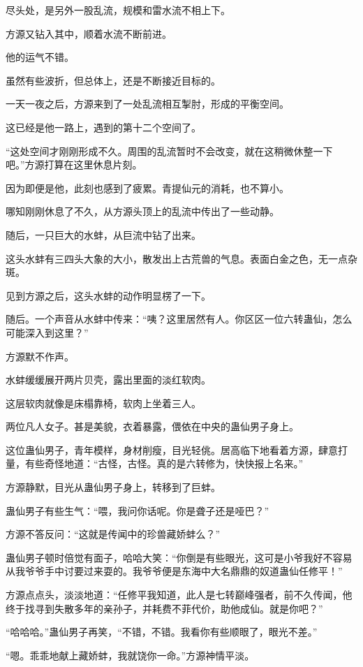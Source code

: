 \begin{this_body}
尽头处，是另外一股乱流，规模和雷水流不相上下。

方源又钻入其中，顺着水流不断前进。

他的运气不错。

虽然有些波折，但总体上，还是不断接近目标的。

一天一夜之后，方源来到了一处乱流相互掣肘，形成的平衡空间。

这已经是他一路上，遇到的第十二个空间了。

“这处空间才刚刚形成不久。周围的乱流暂时不会改变，就在这稍微休整一下吧。”方源打算在这里休息片刻。

因为即便是他，此刻也感到了疲累。青提仙元的消耗，也不算小。

哪知刚刚休息了不久，从方源头顶上的乱流中传出了一些动静。

随后，一只巨大的水蚌，从巨流中钻了出来。

这头水蚌有三四头大象的大小，散发出上古荒兽的气息。表面白金之色，无一点杂斑。

见到方源之后，这头水蚌的动作明显楞了一下。

随后。一个声音从水蚌中传来：“咦？这里居然有人。你区区一位六转蛊仙，怎么可能深入到这里？”

方源默不作声。

水蚌缓缓展开两片贝壳，露出里面的淡红软肉。

这层软肉就像是床榻靠椅，软肉上坐着三人。

两位凡人女子。甚是美貌，衣着暴露，偎依在中央的蛊仙男子身上。

这位蛊仙男子，青年模样，身材削瘦，目光轻佻。居高临下地看着方源，肆意打量，有些奇怪地道：“古怪，古怪。真的是六转修为，快快报上名来。”

方源静默，目光从蛊仙男子身上，转移到了巨蚌。

蛊仙男子有些生气：“喂，我问你话呢。你是聋子还是哑巴？”

方源不答反问：“这就是传闻中的珍兽藏娇蚌么？”

蛊仙男子顿时倍觉有面子，哈哈大笑：“你倒是有些眼光，这可是小爷我好不容易从我爷爷手中讨要过来耍的。我爷爷便是东海中大名鼎鼎的奴道蛊仙任修平！”

方源点点头，淡淡地道：“任修平我知道，此人是七转巅峰强者，前不久传闻，他终于找寻到失散多年的亲孙子，并耗费不菲代价，助他成仙。就是你吧？”

“哈哈哈。”蛊仙男子再笑，“不错，不错。我看你有些顺眼了，眼光不差。”

“嗯。乖乖地献上藏娇蚌，我就饶你一命。”方源神情平淡。


\end{this_body}
